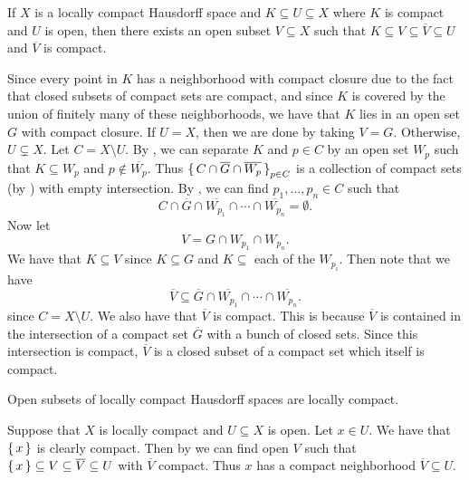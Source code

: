 \documentclass[letterpaper, 11pt, oneside]{book}
\begin{document}
\begin{prop}\label{prop: open_between_compact_and_open}
  If $X$ is a locally compact Hausdorff space and $K \subseteq U \subseteq X$ where $K$ is compact and $U$ is open, then there exists an open subset $V \subseteq X$ such that $K \subseteq V \subseteq \overline{V} \subseteq U$ and $\overline{V}$ is compact.
\end{prop}
\begin{pf}
  Since every point in $K$ has a neighborhood with compact closure due to the fact that closed subsets of compact sets are compact, and since $K$ is covered by the union of finitely many of these neighborhoods, we have that $K$ lies in an open set $G$ with compact closure.
  If $U = X$, then we are done by taking $V = G$.
  Otherwise, $U \subsetneq X$.
  Let $C = X \setminus U$.
  By , we can separate $K$ and $p \in C$ by an open set $W_{p}$ such that $K \subseteq W_{p}$ and $p \notin \overline{W_{p}}$.
  Thus $\set{C \cap \overline{G} \cap \overline{W_{p}}}_{p \in C}$ is a collection of compact sets (by ) with empty intersection.
  By , we can find $p_{1}, \ldots, p_{n} \in C$ such that
  \[
    C \cap \overline{G} \cap \overline{W_{p_{1}}} \cap \cdots \cap \overline{W_{p_{n}}} = \emptyset.
  \]
  Now let
  \[
    V = G \cap W_{p_{1}} \cap W_{p_{n}}.
  \]
  We have that $K \subseteq V$ since $K \subseteq G$ and $K \subseteq$ each of the $W_{p_{i}}$.
  Then note that we have
  \[
    \overline{V} \subseteq \overline{G} \cap \overline{W_{p_{1}}} \cap \cdots \cap \overline{W_{p_{n}}}.
  \]
  since $C = X \setminus U$.
  We also have that $\overline{V}$ is compact.
  This is because $\overline{V}$ is contained in the intersection of a compact set $\overline{G}$ with a bunch of closed sets.
  Since this intersection is compact, $\overline{V}$ is a closed subset of a compact set which itself is compact.
\end{pf}

\begin{prop}\label{prop: open_subset_local_compact}
  Open subsets of locally compact Hausdorff spaces are locally compact.
\end{prop}
\begin{pf}
  Suppose that $X$ is locally compact and $U \subseteq X$ is open.
  Let $x \in U$.
  We have that $\set{x}$ is clearly compact.
  Then by  we can find open $V$ such that $\set{x} \subseteq V \subseteq \overline{V} \subseteq U$ with $\overline{V}$ compact.
  Thus $x$ has a compact neighborhood $\overline{V} \subseteq U$.
\end{pf}
\end{document}

